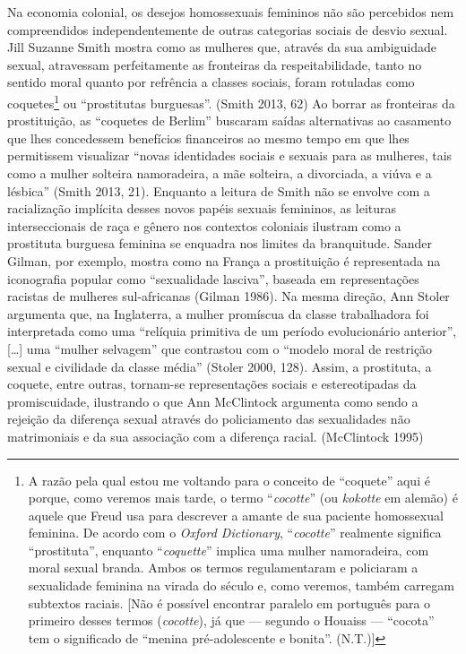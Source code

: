 Na economia colonial, os desejos homossexuais femininos não são
percebidos nem compreendidos independentemente de outras categorias
sociais de desvio sexual. Jill Suzanne Smith mostra como as mulheres
que, através da sua ambiguidade sexual, atravessam perfeitamente as
fronteiras da respeitabilidade, tanto no sentido moral quanto por
refrência a classes sociais, foram rotuladas como coquetes\footnote{A
  razão pela qual estou me voltando para o conceito de ``coquete'' aqui é
  porque, como veremos mais tarde, o termo ``\emph{cocotte}'' (ou
  \emph{kokotte} em alemão) é aquele que Freud usa para descrever a
  amante de sua paciente homossexual feminina. De acordo com o
  \emph{Oxford Dictionary}, ``\emph{cocotte}'' realmente significa
  ``prostituta'', enquanto ``\emph{coquette}'' implica uma mulher
  namoradeira, com moral sexual branda. Ambos os termos regulamentaram e
  policiaram a sexualidade feminina na virada do século e, como veremos,
  também carregam subtextos raciais. {[}Não é possível encontrar
  paralelo em português para o primeiro desses termos (\emph{cocotte}),
  já que --- segundo o Houaiss --- ``cocota'' tem o significado de
  ``menina pré-adolescente e bonita''. (N.T.){]}} ou ``prostitutas
    burguesas''. (Smith 2013, 62) Ao borrar as fronteiras da prostituição, as
``coquetes de Berlim'' buscaram saídas alternativas ao casamento que lhes
concedessem benefícios financeiros ao mesmo tempo em que lhes
permitissem visualizar ``novas identidades sociais e sexuais para as
mulheres, tais como a mulher solteira namoradeira, a mãe solteira, a
divorciada, a viúva e a lésbica'' (Smith 2013, 21). Enquanto a leitura de
Smith não se envolve com a racialização implícita desses novos papéis
sexuais femininos, as leituras interseccionais de raça e gênero nos
contextos coloniais ilustram como a prostituta burguesa feminina se
enquadra nos limites da branquitude. Sander Gilman, por exemplo, mostra
como na França a prostituição é representada na iconografia popular como
``sexualidade lasciva'', baseada em representações racistas de mulheres
sul-africanas (Gilman 1986). Na mesma direção, Ann Stoler argumenta que,
na Inglaterra, a mulher promíscua da classe trabalhadora foi
interpretada como uma ``relíquia primitiva de um período evolucionário
anterior'', {[}\ldots{}{]} uma ``mulher selvagem'' que contrastou com o ``modelo
moral de restrição sexual e civilidade da classe média'' (Stoler 2000,
128). Assim, a prostituta, a coquete, entre outras, tornam-se
representações sociais e estereotipadas da promiscuidade, ilustrando o
que Ann McClintock argumenta como sendo a rejeição da diferença sexual
através do policiamento das sexualidades não matrimoniais e da sua
associação com a diferença racial. (McClintock 1995)

